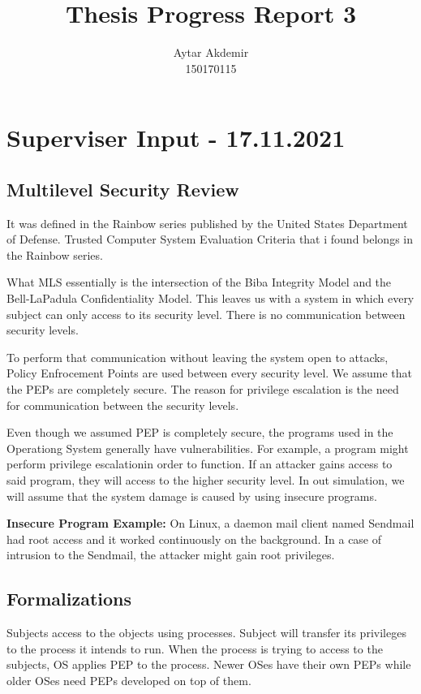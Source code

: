 \documentclass[11pt]{article} %
\title{Thesis Progress Report 3}
\author{Aytar Akdemir \\ 150170115}
\begin{document}
\maketitle

\section{Superviser Input - 17.11.2021}

\subsection{Multilevel Security Review}

It was defined in the Rainbow series published by the United States Department of Defense.
Trusted Computer System Evaluation Criteria that i found belongs in the Rainbow series.
	
What MLS essentially is the intersection of the Biba Integrity Model and the Bell-LaPadula Confidentiality Model.
This leaves us with a system in which every subject can only access to its security level.
There is no communication between security levels.
	
To perform that communication without leaving the system open to attacks, Policy Enfrocement Points are used between every security level.
We assume that the PEPs are completely secure. The reason for privilege escalation is the need for communication between the security levels.

Even though we assumed PEP is completely secure, the programs used in the Operationg System generally have vulnerabilities.
For example, a program might perform privilege escalationin order to function.
If an attacker gains access to said program, they will access to the higher security level.
In out simulation, we will assume that the system damage is caused by using insecure programs.

\textbf{Insecure Program Example:} On Linux, a daemon mail client named Sendmail had root access and it worked continuously on the background.
In a case of intrusion to the Sendmail, the attacker might gain root privileges.

\subsection{Formalizations}

Subjects access to the objects using processes.
Subject will transfer its privileges to the process it intends to run.
When the process is trying to access to the subjects, OS applies PEP to the process.
Newer OSes have their own PEPs while older OSes need PEPs developed on top of them.
\end{document}
